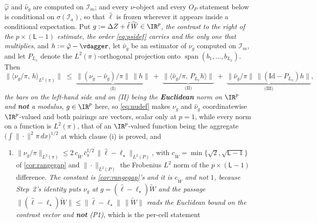 \begin{lemma}
$\hat\varphi$ and $\hat\nu_g$ are computed on $\mathcal I_m$; and every $\nu$-object and every
$O_P$ statement below is conditional on $\sigma(\mathcal I_a)$, so that $\hat\ell$ is frozen wherever it
appears inside a conditional expectation. Put $g:=\Delta Z+\hat\ell\,\widetilde W\in\IR^{p}$, 
\emph{the contrast to the right of the $p\times(\mathsf L-1)$ estimate, the order \eqref{eq:psidef}
carries and the only one that multiplies}, and
$h:=\hat\varphi-\vdagger$, let $\hat\nu_g$ be an estimator of $\nu_g$ computed on $\mathcal I_m$, and let
$P_{L_x}$ denote the $L^{2}(\pi)$-orthogonal projection onto
$\operatorname{span}(b_1,\dots,b_{L_x})$. Then
\begin{equation}\label{eq:balance3}
\big\|\langle\nu_g/\pi,\,h\rangle_{L^{2}(\pi)}\big\|
\;\le\;\underbrace{\big\|(\nu_g-\hat\nu_g)/\pi\big\|\,\|h\|}_{\text{(I)}}
\;+\;\underbrace{\big\|\langle\hat\nu_g/\pi,\,P_{L_x}h\rangle\big\|}_{\text{(II)}}
\;+\;\underbrace{\big\|\hat\nu_g/\pi\big\|\,\big\|(\mathrm{Id}-P_{L_x})h\big\|}_{\text{(III)}},
\end{equation}
\emph{the bars on the left-hand side and on \textup{(II)} being the \textbf{Euclidean} norm on $\IR^{p}$
and \textbf{not} a modulus}, $g\in\IR^{p}$ here, so \eqref{eq:nudef} makes $\nu_g$ and $\hat\nu_g$
coordinatewise $\IR^{p}$-valued and both pairings are vectors, scalar only at $p=1$, while every norm
on a function is $L^{2}(\pi)$, that of an $\IR^{p}$-valued function being the aggregate
$\big(\int\|\cdot\|^{2}\pi\,dx\big)^{1/2}$ at which clause \textup{(i)} is proved, and
\begin{enumerate}
\item[(i)] $\|\nu_g/\pi\|_{L^{2}(\pi)}\le2\,c_{\widetilde W}\,\bar c_\pi^{1/2}\,\|\hat\ell-\ell_\star\|_{L^{2}(P)}$,
with $c_{\widetilde W}=\min\{\sqrt2,\sqrt{\mathsf L-1}\}$ of \cref{cor:rangegap} and
$\|\cdot\|_{L^{2}(P)}$ the Frobenius $L^{2}$ norm of the $p\times(\mathsf L-1)$ difference.
\emph{The constant is \cref{cor:rangegap}'s and it is $c_{\widetilde W}$ and not $1$, because
Step~2's identity puts $\nu_g$ at $g=(\hat\ell-\ell_\star)\widetilde W$ and the passage
$\|(\hat\ell-\ell_\star)\widetilde W\|\le\|\hat\ell-\ell_\star\|\,\|\widetilde W\|$ reads the Euclidean
bound on the contrast vector and \textbf{not} \textup{(P1)}}, which is the per-cell statement

\end{enumerate}
\end{lemma}
